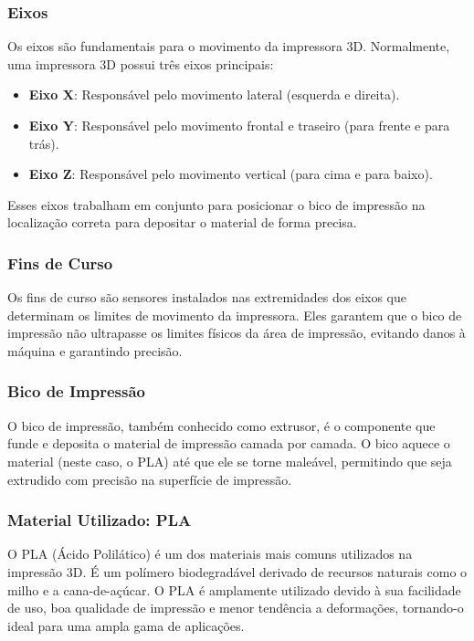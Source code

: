 \documentclass[
]{book}
\providecommand{\tightlist}{%
  \setlength{\itemsep}{0pt}\setlength{\parskip}{0pt}}
\begin{document}
\subsubsection{Eixos}\label{eixos}

Os eixos são fundamentais para o movimento da impressora 3D. Normalmente, uma impressora 3D possui três eixos principais:

\begin{itemize}
\tightlist
\item
  \textbf{Eixo X}: Responsável pelo movimento lateral (esquerda e direita).
\item
  \textbf{Eixo Y}: Responsável pelo movimento frontal e traseiro (para frente e para trás).
\item
  \textbf{Eixo Z}: Responsável pelo movimento vertical (para cima e para baixo).
\end{itemize}

Esses eixos trabalham em conjunto para posicionar o bico de impressão na localização correta para depositar o material de forma precisa.

\subsubsection{Fins de Curso}\label{fins-de-curso}

Os fins de curso são sensores instalados nas extremidades dos eixos que determinam os limites de movimento da impressora. Eles garantem que o bico de impressão não ultrapasse os limites físicos da área de impressão, evitando danos à máquina e garantindo precisão.

\subsubsection{Bico de Impressão}\label{bico-de-impressuxe3o}

O bico de impressão, também conhecido como extrusor, é o componente que funde e deposita o material de impressão camada por camada. O bico aquece o material (neste caso, o PLA) até que ele se torne maleável, permitindo que seja extrudido com precisão na superfície de impressão.

\subsubsection{Material Utilizado: PLA}\label{material-utilizado-pla}

O PLA (Ácido Polilático) é um dos materiais mais comuns utilizados na impressão 3D. É um polímero biodegradável derivado de recursos naturais como o milho e a cana-de-açúcar. O PLA é amplamente utilizado devido à sua facilidade de uso, boa qualidade de impressão e menor tendência a deformações, tornando-o ideal para uma ampla gama de aplicações.
\end{document}
